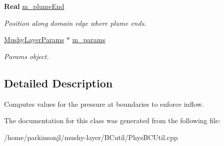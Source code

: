 \begin{DoxyCompactItemize}
\textbf{ Real} \hyperlink{class_pressure_inflow_value_function_ae342d40736d7519d777db87979f2b713}{m\+\_\+plume\+End}
\begin{DoxyCompactList}\small\item\em Position along domain edge where plume ends. \end{DoxyCompactList}\item 
\mbox{\label{class_pressure_inflow_value_function_a77a3ee87530c9cdc4b13a6373addb651}} 
\hyperlink{class_mushy_layer_params}{Mushy\+Layer\+Params} $\ast$ \hyperlink{class_pressure_inflow_value_function_a77a3ee87530c9cdc4b13a6373addb651}{m\+\_\+params}
\begin{DoxyCompactList}\small\item\em Params object. \end{DoxyCompactList}\end{DoxyCompactItemize}


\subsection{Detailed Description}
Computes values for the pressure at boundaries to enforce inflow. 

The documentation for this class was generated from the following file\+:\begin{DoxyCompactItemize}
\item 
/home/parkinsonjl/mushy-\/layer/\+B\+Cutil/Phys\+B\+C\+Util.\+cpp\end{DoxyCompactItemize}
